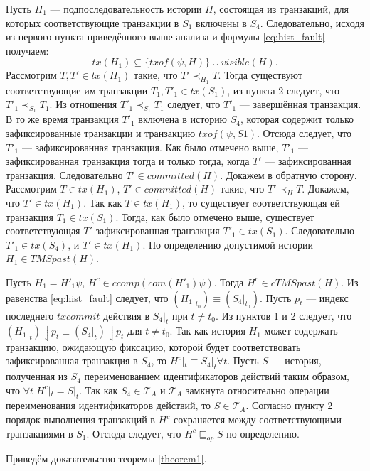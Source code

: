 \begin{myproof}
Пусть $H_1$ --- подпоследовательность истории $H$, состоящая из транзакций, для которых соответствующие транзакции в $S_1$ включены в $S_4$. Следовательно, исходя из первого пункта приведённого выше анализа и формулы \eqref{eq:hist_fault} получаем: $$ tx(H_1) \subseteq \{txof(\psi,H) \} \cup visible(H).$$
Рассмотрим $T, T' \in tx(H_1)$ такие, что $T' \prec_{H_1} T$. Тогда существуют соответствующие им транзакции $T_1,T'_1 \in tx(S_1)$, из пункта 2 следует, что $T'_1 \prec_{S_1} T_1$. Из отношения $T'_1 \prec_{S_1} T_1$ следует, что $T'_1$ --- завершённая транзакция. В то же время транзакция $T'_1$ включена в историю $S_4$, которая содержит только зафиксированные транзакции и транзакцию $txof(\psi, S1)$. Отсюда следует, что $T'_1$ --- зафиксированная транзакция. Как было отмечено выше, $T'_1$ --- зафиксированная транзакция тогда и только тогда, когда $T'$ --- зафиксированная транзакция. Следовательно $T' \in committed(H)$. Докажем в обратную сторону. Рассмотрим $T \in tx(H_1)$, $T' \in committed(H)$ такие, что $T' \prec_H T$. Докажем, что $T' \in tx(H_1)$. Так как $T \in tx(H_1)$, то существует cоответствующая ей транзакция $T_1 \in tx(S_1)$. Тогда, как было отмечено выше, существует соответствующая $T'$ зафиксированная транзакция $T'_1 \in tx(S_1)$. Следовательно $T'_1 \in tx(S_4)$, и $T' \in tx(H_1)$. По определению допустимой истории $H_1 \in TMSpast(H)$. %

Пусть $H_1 = H'_1\psi$, $H^c \in ccomp(com(H'_1)\psi)$. Тогда $H^c \in cTMSpast(H)$. Из равенства \ref{eq:hist_fault} следует, что $(H_1|_{t_0}) \equiv (S_4|_{t_0})$. Пусть $p_t$ --- индекс последнего $txcommit$ действия в $S_4|_t$ при $t \neq t_0$. Из пунктов 1 и 2 следует, что $(H_1|_{t})\downharpoonleft {p_t} \equiv (S_4|_{t})\downharpoonleft {p_t}$ для $t \neq t_0$. Так как история $H_1$ может содержать транзакцию, ожидающую фиксацию, которой будет соответствовать зафиксированная транзакция в $S_4$, то $H^c|_{t} \equiv S_4|_{t} \forall t$. Пусть $S$ --- история, полученная из $S_4$ переименованием идентификаторов действий таким образом, что $\forall t \; H^c|_t = S|_t$. Так как $S_4 \in \mathcal{T}_A$ и $\mathcal{T}_A$ замкнута относительно операции переименования идентификаторов действий, то $S \in \mathcal{T}_A$. Согласно пункту 2 порядок выполнения транзакций в $H^c$ сохраняется между соответствующими транзакциями в $S_1$. Отсюда следует, что $H^c \sqsubseteq_{op} S$ по определению. 
\end{myproof}
Приведём доказательство теоремы \ref{theorem1}.
